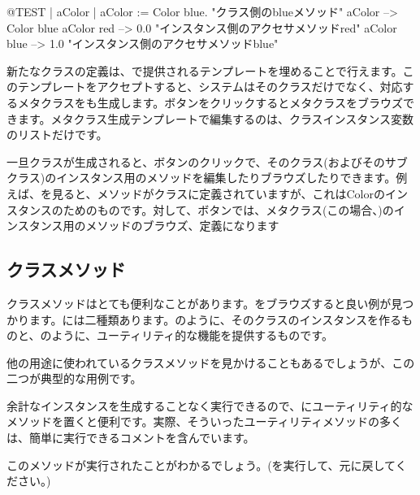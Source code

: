 \documentclass[a4paper,10pt,twoside]{book}
\begin{document}
\begin{code}{@TEST | aColor |}
aColor := Color blue.               "クラス側のblueメソッド"
aColor        --> Color blue
aColor red  --> 0.0         "インスタンス側のアクセサメソッドred"
aColor blue --> 1.0        "インスタンス側のアクセサメソッドblue"
\end{code}

新たなクラスの定義は、で提供されるテンプレートを埋めることで行えます。このテンプレートをアクセプトすると、システムはそのクラスだけでなく、対応するメタクラスをも生成します。ボタンをクリックするとメタクラスをブラウズできます。メタクラス生成テンプレートで編集するのは、クラスインスタンス変数のリストだけです。

一旦クラスが生成されると、ボタンのクリックで、そのクラス(およびそのサブクラス)のインスタンス用のメソッドを編集したりブラウズしたりできます。例えば、を見ると、メソッドがクラスに定義されていますが、これはColorのインスタンスのためのものです。対して、ボタンでは、メタクラス(この場合、)のインスタンス用のメソッドのブラウズ、定義になります

\subsection{クラスメソッド} 

クラスメソッドはとても便利なことがあります。をブラウズすると良い例が見つかります。には二種類あります。のように、そのクラスのインスタンスを作るものと、のように、ユーティリティ的な機能を提供するものです。

他の用途に使われているクラスメソッドを見かけることもあるでしょうが、この二つが典型的な用例です。

余計なインスタンスを生成することなく実行できるので、にユーティリティ的なメソッドを置くと便利です。実際、そういったユーティリティメソッドの多くは、簡単に実行できるコメントを含んでいます。

このメソッドが実行されたことがわかるでしょう。(を実行して、元に戻してください。)
\end{document}
